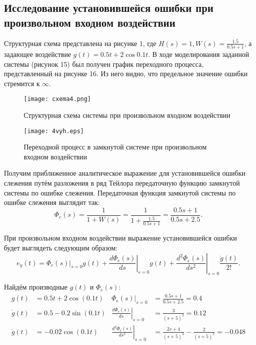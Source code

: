 \documentclass[12pt,a4paper]{article}
\begin{document}
\newpage
\begin{center}
\section{Исследование установившейся ошибки при произвольном входном воздействии}
\end{center}\par
 Структурная схема представлена на рисунке 1, где $H(s) = 1, W(s) = \displaystyle{\frac{1.5}{0.5s + 1}}$, а задающее воздействие $g(t) = 0.5t + 2\cos{0.1t}$.
 В ходе моделирования заданной системы (рисунок 15) был получен график переходного процесса, представленный на рисунке 16. Из него видно, что предельное значение ошибки стремится к $\infty$. 
\begin{figure}[H]
    \centering
    \texttt{[image: cxema4.png]}
    \caption{Структурная схема системы при произвольном входном воздействии}
\end{figure}
\begin{figure}[H]
    \centering
    \texttt{[image: 4vyh.eps]}
    \caption{Переходной процесс в замкнутой системе при произвольном входном воздействии}
\end{figure}
Получим приближенное аналитическое выражение для установившейся ошибки слежения путём разложения в ряд Тейлора передаточную функцию замкнутой системы по ошибке слежения.
Передаточная функция замкнутой системы по ошибке слежения выглядит так:
\begin{equation}
   \Phi_e(s) = \frac{1}{1 + W(s)} = \frac{1}{1 + \displaystyle{\frac{1.5}{0.5s + 1}}} = \frac{0.5s+1}{0.5s+2.5}.
\end{equation}\par
При произвольном входном воздействии выражение установившейся ошибки будет выглядеть следующим образом:
\begin{equation}
    e_y(t) = \Phi_e(s)|_{s=0}g(t) + \left.\frac{d\Phi_e(s)}{ds}\right|_{s=0}\dot{g}(t) + \left.\frac{d^2\Phi_e(s)}{ds^2}\right|_{s=0}\frac{\ddot{g}(t)}{2!}.
\end{equation}\par
Найдём производные $g(t)$ и $\Phi_e(s)$:
\begin{align*}
    g(t) & = 0.5t + 2\cos{(0.1t)} & \Phi_e(s)|_{s=0} & = \frac{0.5s+1}{0.5s+2.5} = 0.4 \\
    \dot{g}(t) & = 0.5 - 0.2\sin{(0.1t)} & \left.\frac{d\Phi_e(s)}{ds}\right|_{s=0} & = \frac{3}{(s+5)^2} = 0.12 \\
    \ddot{g}(t) & = - 0.02\cos{(0.1t)} & \left.\frac{d^2\Phi_e(s)}{ds^2}\right|_{s=0} & = \frac{2s+4}{(s+5)^3} - \frac{2}{(s+5)^2} = -0.048 \\
\end{align*}\par
\end{document}
